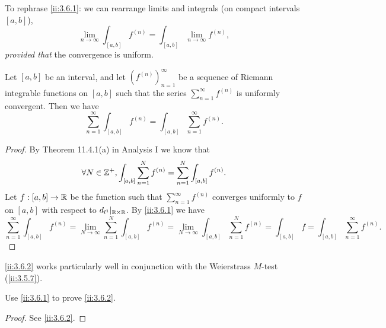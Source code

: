 \begin{note}
  To rephrase \cref{ii:3.6.1}:
  we can rearrange limits and integrals (on compact intervals \([a, b]\)),
  \[
    \lim_{n \to \infty} \int_{[a, b]} f^{(n)} = \int_{[a, b]} \lim_{n \to \infty} f^{(n)},
  \]
  \emph{provided that} the convergence is uniform.
\end{note}

\begin{cor}\label{ii:3.6.2}
  Let \([a, b]\) be an interval, and let \((f^{(n)})_{n = 1}^\infty\) be a sequence of Riemann integrable functions on \([a, b]\) such that the series \(\sum_{n = 1}^\infty f^{(n)}\) is uniformly convergent.
  Then we have
  \[
    \sum_{n = 1}^\infty \int_{[a, b]} f^{(n)} = \int_{[a, b]} \sum_{n = 1}^\infty f^{(n)}.
  \]
\end{cor}

\begin{proof}
  By Theorem 11.4.1(a) in Analysis I we know that
  \[
    \forall N \in \mathbb{Z}^+, \int_{[a, b]} \sum_{n = 1}^N f^{(n)} = \sum_{n = 1}^N \int_{[a, b]} f^{(n)}.
  \]
  Let \(f : [a, b] \to \mathbb{R}\) be the function such that \(\sum_{n = 1}^\infty f^{(n)}\) converges uniformly to \(f\) on \([a, b]\) with respect to \(d_{l^1}|_{\mathbb{R} \times \mathbb{R}}\).
  By \cref{ii:3.6.1} we have
  \[
    \sum_{n = 1}^\infty \int_{[a, b]} f^{(n)} = \lim_{N \to \infty} \sum_{n = 1}^N \int_{[a, b]} f^{(n)} = \lim_{N \to \infty} \int_{[a, b]} \sum_{n = 1}^N f^{(n)} = \int_{[a, b]} f = \int_{[a, b]} \sum_{n = 1}^\infty f^{(n)}.
  \]
\end{proof}

\begin{note}
  \cref{ii:3.6.2} works particularly well in conjunction with the Weierstrass \(M\)-test
  (\cref{ii:3.5.7}).
\end{note}

\exercisesection

\begin{ex}\label{ii:ex:3.6.1}
  Use \cref{ii:3.6.1} to prove \cref{ii:3.6.2}.
\end{ex}

\begin{proof}
  See \cref{ii:3.6.2}.
\end{proof}
